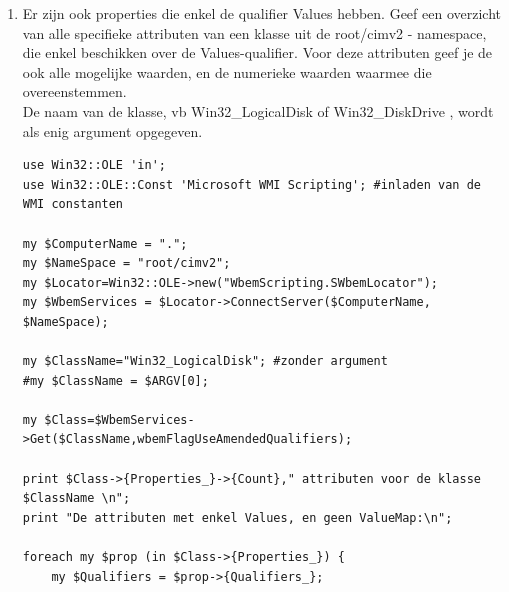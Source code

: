 \documentclass[11pt,a4paper]{report}
\begin{document}
\begin{enumerate}[resume]
\begin{lstlisting}
printf "%s: %s\n", "DNS registration enabled", $AdapterInstance->{DomainDNSRegistrationEnabled};
printf "%s: %s\n", "DNS FULL registration enabled", $AdapterInstance->{FullDNSRegistrationEnabled};
printf "%s: %s\n", "DNS search order", (join ",",@{$AdapterInstance->{DNSServerSearchOrder}});
printf "%s: %s\n", "DNS domain", $AdapterInstance->{DNSDomain};
printf "%s: %s\n", "DNS domain suffix search order", $AdapterInstance->{DNSDomainSuffixSearchOrder};
printf "%s: %s\n", "DNS enabled for WINS resolution", $AdapterInstance->{DNSEnabledForWINSResolution};
}
#Andere oplossing zonder query . Vervang in (*)  ->execquery door:

#my $AdapterInstances = $WbemServices->InstancesOf("Win32_NetworkAdapter");

#foreach $AdapterInstance (sort {uc($a->{NetConnectionID}) cmp uc($b->{NetConnectionID})} in $AdapterInstances) {
#    next unless defined $AdapterInstance->{NetConnectionStatus};
#....
	\end{lstlisting}
	\item Er zijn ook properties die enkel de qualifier Values hebben. Geef een overzicht van alle specifieke attributen van een klasse uit de root/cimv2 - namespace, die enkel beschikken over de Values-qualifier. Voor deze attributen geef je de ook alle mogelijke waarden, en de numerieke waarden waarmee die overeenstemmen.
	\\ De naam van de klasse, vb Win32\_LogicalDisk of Win32\_DiskDrive , wordt als enig argument opgegeven.	
	\begin{lstlisting}
use Win32::OLE 'in';
use Win32::OLE::Const 'Microsoft WMI Scripting'; #inladen van de WMI constanten

my $ComputerName = ".";
my $NameSpace = "root/cimv2";
my $Locator=Win32::OLE->new("WbemScripting.SWbemLocator");
my $WbemServices = $Locator->ConnectServer($ComputerName, $NameSpace);

my $ClassName="Win32_LogicalDisk"; #zonder argument
#my $ClassName = $ARGV[0]; 

my $Class=$WbemServices->Get($ClassName,wbemFlagUseAmendedQualifiers);

print $Class->{Properties_}->{Count}," attributen voor de klasse $ClassName \n";
print "De attributen met enkel Values, en geen ValueMap:\n";

foreach my $prop (in $Class->{Properties_}) {
	my $Qualifiers = $prop->{Qualifiers_};
	

\end{lstlisting}
\end{enumerate}
\end{document}
